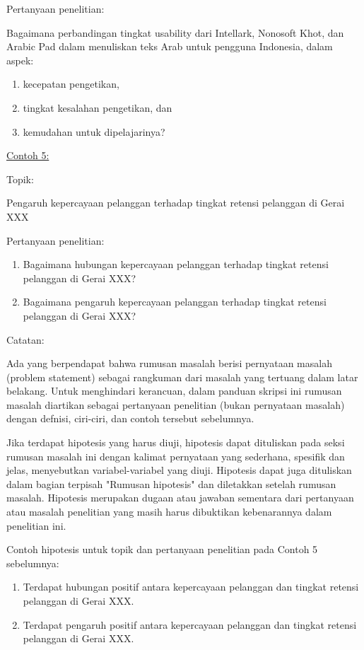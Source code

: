\noindent Pertanyaan penelitian:
\begin{displayquote}
  Bagaimana perbandingan tingkat usability dari Intellark, Nonosoft Khot, dan Arabic Pad dalam menuliskan teks Arab untuk pengguna Indonesia, dalam aspek:
  \begin{enumerate}
    \item kecepatan pengetikan,
    \item tingkat kesalahan pengetikan, dan
    \item kemudahan untuk dipelajarinya?   
  \end{enumerate}
\end{displayquote}

\noindent\underline{Contoh 5:}

\noindent Topik:

\begin{displayquote}
  Pengaruh kepercayaan pelanggan terhadap tingkat retensi pelanggan di Gerai XXX
\end{displayquote}

\noindent Pertanyaan penelitian:

\begin{enumerate}
  \item Bagaimana hubungan kepercayaan pelanggan terhadap tingkat retensi pelanggan di Gerai XXX?
  \item Bagaimana pengaruh kepercayaan pelanggan terhadap tingkat retensi pelanggan di Gerai XXX?  
\end{enumerate}

\noindent Catatan: 

Ada yang berpendapat bahwa rumusan masalah berisi pernyataan masalah (problem statement) sebagai rangkuman dari masalah yang tertuang dalam latar belakang. Untuk menghindari kerancuan, dalam panduan skripsi ini rumusan masalah diartikan sebagai pertanyaan penelitian (bukan pernyataan masalah) dengan defnisi, ciri-ciri, dan contoh tersebut sebelumnya. 

Jika terdapat hipotesis yang harus diuji, hipotesis dapat dituliskan pada seksi rumusan masalah ini dengan kalimat pernyataan yang sederhana, spesifik dan jelas, menyebutkan variabel-variabel yang diuji. Hipotesis dapat juga dituliskan dalam bagian terpisah "Rumusan hipotesis" dan diletakkan setelah rumusan masalah. Hipotesis merupakan dugaan atau jawaban sementara dari pertanyaan atau masalah penelitian yang masih harus dibuktikan kebenarannya dalam penelitian ini.

Contoh hipotesis untuk topik dan pertanyaan penelitian pada Contoh 5 sebelumnya:
\begin{enumerate}
  \item Terdapat hubungan positif antara kepercayaan pelanggan dan tingkat retensi pelanggan di Gerai XXX. 
  \item Terdapat pengaruh positif antara kepercayaan pelanggan dan tingkat retensi pelanggan di Gerai XXX.
\end{enumerate}

